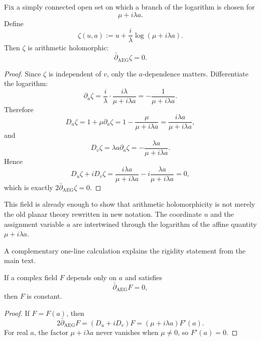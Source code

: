 \begin{proposition}
\label{prop:appD-zeta}
Fix a simply connected open set on which a branch of the logarithm is chosen for
\[
\mu+i\lambda a.
\]
Define
\[
\zeta(u,a):=u+\frac{i}{\lambda}\log(\mu+i\lambda a).
\]
Then $\zeta$ is arithmetic holomorphic:
\[
\bar\partial_{\mathrm{AEG}}\zeta=0.
\]
\end{proposition}

\begin{proof}
Since $\zeta$ is independent of $v$, only the $a$-dependence matters.
Differentiate the logarithm:
\[
\partial_a\zeta
=\frac{i}{\lambda}\cdot\frac{i\lambda}{\mu+i\lambda a}
=-\frac{1}{\mu+i\lambda a}.
\]
Therefore
\[
D_u\zeta
=1+\mu\partial_a\zeta
=1-\frac{\mu}{\mu+i\lambda a}
=\frac{i\lambda a}{\mu+i\lambda a},
\]
and
\[
D_v\zeta
=\lambda a\partial_a\zeta
=-\frac{\lambda a}{\mu+i\lambda a}.
\]
Hence
\[
D_u\zeta+iD_v\zeta
=\frac{i\lambda a}{\mu+i\lambda a}-i\frac{\lambda a}{\mu+i\lambda a}=0,
\]
which is exactly $2\bar\partial_{\mathrm{AEG}}\zeta=0$.
\end{proof}

This field is already enough to show that arithmetic holomorphicity is not merely the old planar theory rewritten in new notation. The coordinate $u$ and the assignment variable $a$ are intertwined through the logarithm of the affine quantity $\mu+i\lambda a$.

A complementary one-line calculation explains the rigidity statement from the main text.

\begin{corollary}
\label{cor:appD-rigidity-a-only}
If a complex field $F$ depends only on $a$ and satisfies
\[
\bar\partial_{\mathrm{AEG}}F=0,
\]
then $F$ is constant.
\end{corollary}

\begin{proof}
If $F=F(a)$, then
\[
2\bar\partial_{\mathrm{AEG}}F
=(D_u+iD_v)F
=(\mu+i\lambda a)F'(a).
\]
For real $a$, the factor $\mu+i\lambda a$ never vanishes when $\mu\neq 0$, so $F'(a)=0$.
\end{proof}
